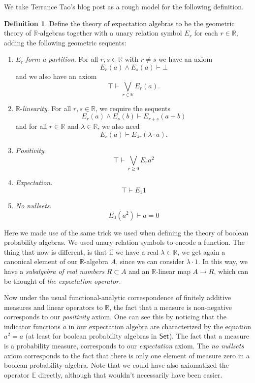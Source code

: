 \documentclass[a4paper]{amsproc}
\theoremstyle{plain}
\theoremstyle{definition}
\newtheorem{definition}[theorem]{Definition}
\theoremstyle{remark}
\numberwithin{equation}{section}
\newcommand{\Set}{\textup{\textsf{Set}}}
\begin{document}
We take Terrance Tao's blog post \cite{tao2014algebraic} as a rough model for the following definition.

\begin{definition}
    Define the theory of expectation algebras to be the geometric theory of $\mathbb{R}$-algebras together with a unary relation symbol $E_r$ for each $r \in \mathbb{R}$, adding the following geometric sequents:
    \begin{enumerate}
        \item \textit{$E_r$ form a partition}. For all $r, s \in \mathbb{R}$ with $r \neq s$ we have an axiom
        \[
        E_r(a)  \wedge E_s(a) \vdash \bot
        \]
        and we also have an axiom
        \[
        \top \vdash \bigvee_{r \in \mathbb{R}} E_r(a).
        \]
        \item $\mathbb{R}$-\textit{linearity}. For all $r, s \in \mathbb{R}$, we require the sequents
        \[
        E_r(a) \wedge E_s(b) \vdash E_{r+s}(a + b)
        \]
        and for all $r \in \mathbb{R}$ and $\lambda \in \mathbb{R}$, we also need
        \[
        E_r(a) \vdash E_{\lambda r} (\lambda \cdot a) .
        \]
        \item \textit{Positivity}.
        \[
            \top \vdash \bigvee_{r \geq 0} E_r a^2
        \]
        \item \textit{Expectation}.
        \[
            \top \vdash E_1 1
        \]
        \item \textit{No nullsets}.
        \[
            E_0 (a^2) \vdash a = 0 %
        \]
    \end{enumerate}
\end{definition}

Here we made use of the same trick we used when defining the theory of boolean probability algebras. We used unary relation symbols to encode a function. The thing that now is different, is that if we have a real $\lambda \in \mathbb{R}$, we get again a canonical element of our $\mathbb{R}$-algebra $A$, since we can consider $\lambda \cdot 1$. In this way, we have a \emph{subalgebra of real numbers} $R \subset A$ and an $\mathbb{R}$-linear map $A \to R$, which can be thought of \emph{the expectation operator.}

Now under the usual functional-analytic correspondence of finitely additive measures and linear operators to $\mathbb{R}$, the fact that a measure is non-negative corresponds to our \emph{positivity} axiom. One can see this by noticing that the indicator functions $a$ in our expectation algebra are characterized by the equation $a^2 = a$ (at least for boolean probability algebras in $\Set$). The fact that a measure is a probability measure, corresponds to our \emph{expectation} axiom. The \emph{no nullsets} axiom corresponds to the fact that there is only one element of measure zero in a boolean probability algebra. Note that we could have also axiomatized the operator $\mathbb{E}$ directly, although that wouldn't necessarily have been easier.
\end{document}
